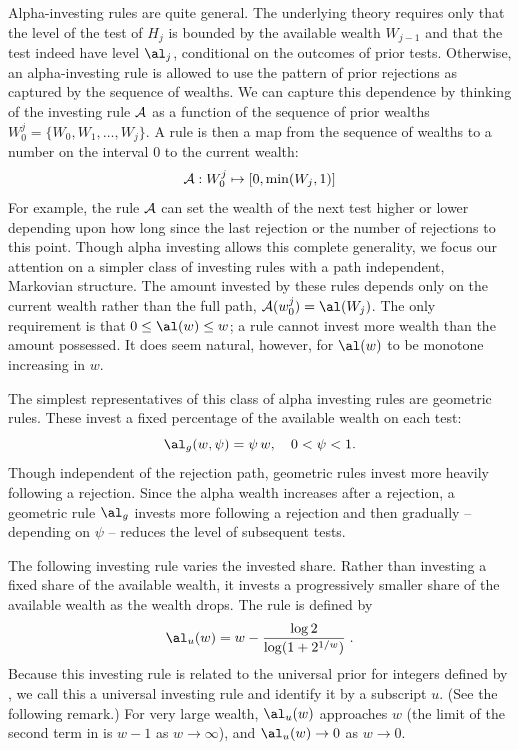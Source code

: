 \documentclass[12pt]{article}
\begin{document}
 
 Alpha-investing rules are quite general.  The underlying theory requires only
 that the level of the test of $H_j$ is bounded by the available wealth
 $W_{j-1}$ and that the test indeed have level $\al_j$, conditional on the
 outcomes of prior tests.  Otherwise, an alpha-investing rule is allowed to use
 the pattern of prior rejections as captured by the sequence of wealths.  We can
 capture this dependence by thinking of the investing rule ${\cal A}$ as a
 function of the sequence of prior wealths $W_0^j = \{W_0, W_1, \ldots, W_j\}$.
  A rule is then a map from the sequence of wealths to a number on the interval
 0 to the current wealth:
 \begin{equation}
    {\cal A}: W_0^j \mapsto [0, \min(W_j,1)]    
 \label{eq:A}
 \end{equation}
 For example, the rule $\cal A$ can set the wealth of the next test higher or
 lower depending upon how long since the last rejection or the number of
 rejections to this point.  Though alpha investing allows this complete
 generality, we focus our attention on a simpler class of investing rules with a
 path independent, Markovian structure.  The amount invested by these rules
 depends only on the current wealth rather than the full path, ${\cal A}(w_0^j)
 = \al(W_j)$.  The only requirement is that $0 \le \al(w) \le w$; a rule cannot
 invest more wealth than the amount possessed.  It does seem natural, however,
 for $\al(w)$ to be monotone increasing in $w$.


 The simplest representatives of this class of alpha investing rules are
 geometric rules.  These invest a fixed percentage of the available wealth on
 each test:
 \begin{equation}
    \al_g(w, \psi) = \psi \, w, \quad  0 < \psi < 1.
 \label{eq:Ageo}
 \end{equation}
 Though independent of the rejection path, geometric rules invest more heavily
 following a rejection.  Since the alpha wealth increases after a rejection, a
 geometric rule $\al_g$ invests more following a rejection and then gradually --
 depending on $\psi$ -- reduces the level of subsequent tests.


 The following investing rule varies the invested share.  Rather than investing
 a fixed share of the available wealth, it invests a progressively smaller share
 of the available wealth as the wealth drops.  The rule is defined by
 \begin{equation}
   \al_u(w) = w - \frac{\log 2}{\log(1+2^{1/w})} \;.   
 \label{eq:Auniv}
 \end{equation}
 Because this investing rule is related to the universal prior for integers
 defined by \citet{rissanen83}, we call this a universal investing rule and
 identify it by a subscript $u$.  (See the following remark.)  For very large
 wealth, $\al_u(w)$ approaches $w$ (the limit of the second term in
  is $w-1$ as $w \rightarrow \infty$), and $\al_u(w)
 \rightarrow 0$ as $w \rightarrow 0$.
\end{document}

